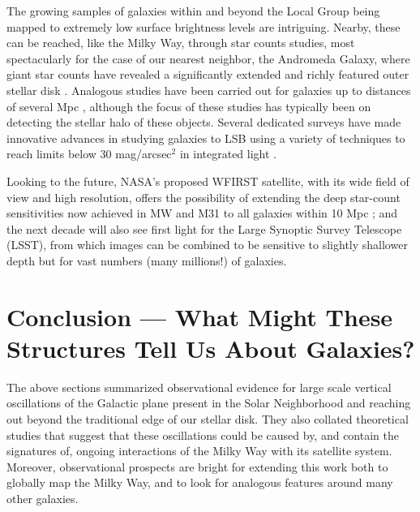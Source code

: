 \documentclass[galaxies,article,submit,moreauthors,pdftex,10pt,a4paper]{mdpi}
\begin{document}
The growing samples of galaxies within and beyond the Local Group being mapped to extremely low surface brightness levels are intriguing.
Nearby, these can be reached, like the Milky Way, through star counts studies, most spectacularly for the case of our nearest neighbor, the Andromeda Galaxy, where giant star counts have revealed a significantly extended and richly featured outer stellar disk \cite{ferguson02,ibata05}.
Analogous studies have been carried out for galaxies up to distances of several Mpc \cite[e.g.,][]{monachesi13,crnojevi16}, although the focus of these studies has typically been on detecting the stellar halo of these objects.
Several dedicated surveys have made innovative advances in studying galaxies to LSB using a variety of techniques to reach limits below 30  mag/arcsec$^2$ in integrated light \citep[e.g.][]{delgado10,vandokkum14,duc15}.

Looking to the future,
NASA's proposed WFIRST satellite, with its wide field of view and high resolution, offers the possibility of extending the deep star-count sensitivities now achieved in MW and M31 to all galaxies within 10 Mpc \cite{spergel13}; and
the next decade will also see first light for the Large Synoptic Survey Telescope (LSST), from which images can be combined to be sensitive to slightly shallower depth \citep[$\sim$29 mag/arcsec$^2$, see][]{ivezic08} but for vast numbers (many millions!) of galaxies.


\section{Conclusion --- What Might These Structures Tell Us About Galaxies?}


\label{sec:conc}

The above sections  summarized observational evidence for large scale vertical oscillations of the Galactic plane present in the Solar Neighborhood and reaching out beyond the traditional edge of our stellar disk.
They also collated theoretical studies that suggest that these oscillations could be caused by, and contain the signatures of, ongoing interactions of the Milky Way with its satellite system.
Moreover, observational prospects are bright for extending this work both to globally map the Milky Way, and to look for analogous features around many other galaxies.
\end{document}
